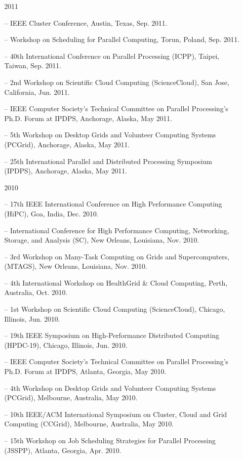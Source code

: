 \documentclass[times,11pt]{letter}
\begin{document}
\begin{itemize}
\item [2011]
\item[--]  IEEE Cluster Conference, Austin, Texas, Sep. 2011.
\item[--]  Workshop on Scheduling for Parallel Computing, Torun, Poland, Sep. 2011.
\item[--]  40th International Conference on Parallel Processing (ICPP), Taipei, Taiwan, Sep. 2011.
\item[--]  2nd Workshop on Scientific Cloud Computing (ScienceCloud), San Jose, California, Jun. 2011. 
\item[--]  IEEE Computer Society's Technical Committee on Parallel Processing's Ph.D. Forum at IPDPS, Anchorage, Alaska, May 2011.
\item[--]  5th Workshop on Desktop Grids and Volunteer Computing Systems (PCGrid), Anchorage, Alaska, May 2011.
\item[--]  25th International Parallel and Distributed Processing Symposium (IPDPS), Anchorage, Alaska, May 2011.

\item [2010]
\item[--] 17th IEEE International Conference on High Performance Computing (HiPC), Goa, India, Dec. 2010.
\item[--]  International Conference for High Performance Computing, Networking, Storage, and Analysis (SC), New Orleans, Louisiana, Nov. 2010.
\item[--]  3rd Workshop on Many-Task Computing on Grids and Supercomputers, (MTAGS), New Orleans, Louisiana, Nov. 2010.
\item[--] 4th International Workshop on HealthGrid \& Cloud Computing, Perth, Australia, Oct. 2010.
\item[--]  1st Workshop on Scientific Cloud Computing (ScienceCloud), Chicago, Illinois, Jun. 2010. 
\item[--]  19th IEEE Symposium on High-Performance Distributed Computing (HPDC-19), Chicago, Illinois, Jun. 2010. 
\item[--]  IEEE Computer Society's Technical Committee on Parallel Processing's Ph.D. Forum at IPDPS, Atlanta, Georgia, May 2010.
\item[--]  4th Workshop on Desktop Grids and Volunteer Computing Systems (PCGrid), Melbourne, Australia, May 2010.
\item[--]  10th IEEE/ACM International Symposium on Cluster, Cloud and Grid Computing (CCGrid), Melbourne, Australia, May 2010.
\item[--]  15th Workshop on Job Scheduling Strategies for Parallel Processing (JSSPP),  Atlanta, Georgia, Apr. 2010.


\end{itemize}
\end{document}
